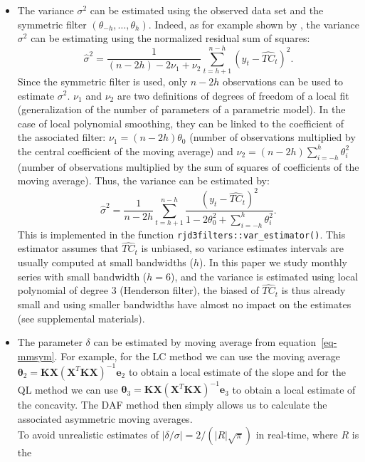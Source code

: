 \documentclass[
]{article}
\newcommand\transp[1]{{#1}^T}
\newcommand\1{\mathds{1}}
\begin{document}
\begin{itemize}
\item
  The variance \(\sigma^2\) can be estimated using the observed data set
  and the symmetric filter \((\theta_{-h},\dots,\theta_h)\). Indeed, as
  for example shown by \textcite{Loader1999}, the variance \(\sigma^2\)
  can be estimating using the normalized residual sum of squares: \[
  \hat\sigma^2=\frac{1}{(n-2h)-2\nu_1+\nu_2}\sum_{t=h+1}^{n-h}(y_t-\widehat{TC}_t)^2.
  \] Since the symmetric filter is used, only \(n-2h\) observations can
  be used to estimate \(\sigma^2\). \(\nu_1\) and \(\nu_2\) are two
  definitions of degrees of freedom of a local fit (generalization of
  the number of parameters of a parametric model). In the case of local
  polynomial smoothing, they can be linked to the coefficient of the
  associated filter: \(\nu_1 = (n-2h)\theta_0\) (number of observations
  multiplied by the central coefficient of the moving average) and
  \(\nu_2 = (n-2h)\sum_{i=-h}^{h} \theta_i^2\) (number of observations
  multiplied by the sum of squares of coefficients of the moving
  average). Thus, the variance can be estimated by: \[
  \hat\sigma^2=\frac{1}{n-2h}\sum_{t=h+1}^{n-h}\frac{(y_t-\widehat{TC}_t)^2}{1-2\theta_0^2+\sum_{i=-h}^{h} \theta_i^2}.
  \] This is implemented in the function
  \texttt{rjd3filters::var\_estimator()}. This estimator assumes that
  \(\widehat{TC}_t\) is unbiased, so variance estimates intervals are
  usually computed at small bandwidths (\(h\)). In this paper we study
  monthly series with small bandwidth (\(h=6\)), and the variance is
  estimated using local polynomial of degree 3 (Henderson filter), the
  biased of \(\widehat{TC}_t\) is thus already small and using smaller
  bandwidths have almost no impact on the estimates (see supplemental
  materials).
\item
  The parameter \(\delta\) can be estimated by moving average from
  equation~\ref{eq-mmsym}. For example, for the LC method we can use the
  moving average
  \(\boldsymbol \theta_2=\boldsymbol K\boldsymbol X(\transp{\boldsymbol X}\boldsymbol K\boldsymbol X)^{-1}\boldsymbol e_{2}\)
  to obtain a local estimate of the slope and for the QL method we can
  use
  \(\boldsymbol \theta_3=\boldsymbol K\boldsymbol X(\transp{\boldsymbol X}\boldsymbol K\boldsymbol X)^{-1}\boldsymbol e_{3}\)
  to obtain a local estimate of the concavity. The DAF method then
  simply allows us to calculate the associated asymmetric moving
  averages.\\
  To avoid unrealistic estimates of
  \(|\delta/\sigma|=2/(|R|\sqrt{\pi})\) in real-time, where \(R\) is the

\end{itemize}
\end{document}
